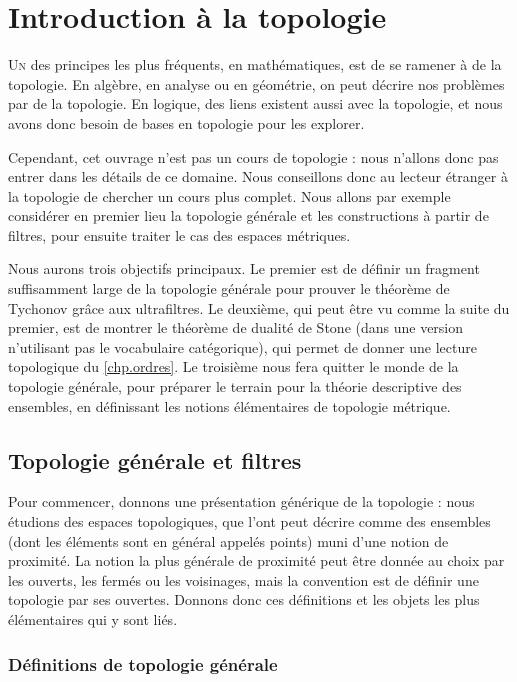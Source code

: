 \chapter[Topologie]{Introduction à la topologie}
\label{chp.topo}

\minitoc

\lettrine{U}{n} des principes les plus fréquents, en mathématiques, est de se
ramener à de la topologie. En algèbre, en analyse ou en géométrie, on peut
décrire nos problèmes par de la topologie. En logique, des liens existent aussi
avec la topologie, et nous avons donc besoin de bases en topologie pour les
explorer.

Cependant, cet ouvrage n'est pas un cours de topologie : nous n'allons donc pas
entrer dans les détails de ce domaine. Nous conseillons donc au lecteur étranger
à la topologie de chercher un cours plus complet. Nous allons par exemple
considérer en premier lieu la topologie générale et les constructions à partir
de filtres, pour ensuite traiter le cas des espaces métriques.

Nous aurons trois objectifs principaux.
Le premier est de définir un fragment suffisamment large de la topologie
générale pour prouver le théorème de Tychonov grâce aux ultrafiltres.
Le deuxième, qui peut être vu comme la suite du premier, est de montrer le
théorème de dualité de Stone (dans une version n'utilisant pas le vocabulaire
catégorique), qui permet de donner une lecture topologique du \cref{chp.ordres}.
Le troisième nous fera quitter le monde de la topologie générale, pour préparer
le terrain pour la théorie descriptive des ensembles, en définissant les notions
élémentaires de topologie métrique.

\section{Topologie générale et filtres}

Pour commencer, donnons une présentation générique de la topologie : nous
étudions des espaces topologiques, que l'ont peut décrire comme des ensembles
(dont les éléments sont en général appelés \og points\fg{}) muni d'une notion de
proximité. La notion la plus générale de proximité peut être donnée au choix
par les ouverts, les fermés ou les voisinages, mais la convention est de définir
une topologie par ses ouvertes. Donnons donc ces définitions et les objets les
plus élémentaires qui y sont liés.

\subsection{Définitions de topologie générale}

